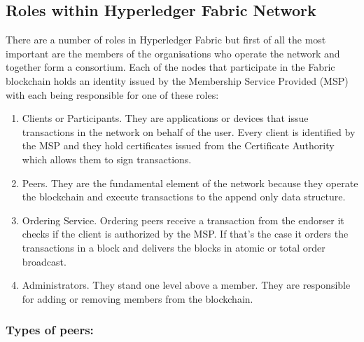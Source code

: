 \subsection{Roles within Hyperledger Fabric Network}
There are a number of roles in Hyperledger Fabric but first of all the most important are the members of the organisations who operate the network and together form a consortium.
Each of the nodes that participate in the Fabric blockchain holds an identity issued by the Membership Service Provided (MSP) with each being responsible for one of these roles:
\begin{enumerate}
  \item Clients or Participants. They are applications or devices that issue transactions in the network on behalf of the user. Every client is identified by the MSP and they hold certificates issued from the Certificate Authority which allows them to sign transactions.
  \item Peers. They are the fundamental element of the network because they operate the blockchain and execute transactions to the append only data structure. 
  
  \item Ordering Service. Ordering peers receive a transaction from the endorser it checks if the client is authorized by the MSP. If that's the case it orders the transactions in a block and delivers the blocks in atomic or total order broadcast. 
  
  \item Administrators. They stand one level above a member. They are responsible for adding or removing members from the blockchain. 
  
\end{enumerate}

\subsubsection{Types of peers: }


